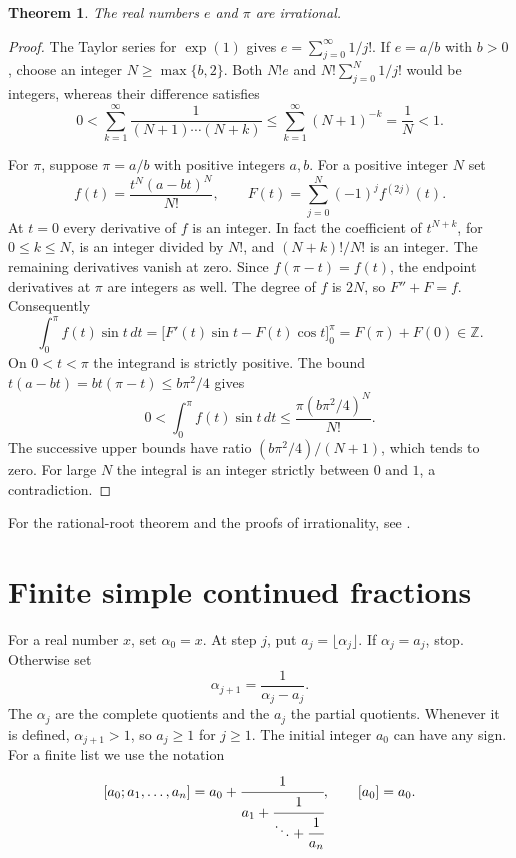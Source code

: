 \documentclass[11pt,oneside,openany]{book}
\theoremstyle{plain}
\newtheorem{theorem}{Theorem}[chapter]
\theoremstyle{definition}
\theoremstyle{remark}
\begin{document}
\begin{theorem}
The real numbers \(e\) and \(\pi\) are irrational.
\end{theorem}
\begin{proof}
The Taylor series for \(\exp(1)\) gives
\(e=\sum_{j=0}^{\infty}1/j!\). If \(e=a/b\) with \(b>0\), choose an
integer \(N\ge\max\{b,2\}\). Both \(N!e\) and
\(N!\sum_{j=0}^N1/j!\) would be integers, whereas their difference
satisfies
\[
 0<\sum_{k=1}^{\infty}\frac{1}{(N+1)\cdots(N+k)}
 \le \sum_{k=1}^{\infty}(N+1)^{-k}=\frac1N<1.
\]

For \(\pi\), suppose \(\pi=a/b\) with positive integers \(a,b\). For
a positive integer \(N\) set
\[
 f(t)=\frac{t^N(a-bt)^N}{N!},\qquad
 F(t)=\sum_{j=0}^{N}(-1)^j f^{(2j)}(t).
\]
At \(t=0\) every derivative of \(f\) is an integer. In fact the
coefficient of \(t^{N+k}\), for \(0\le k\le N\), is an integer divided
by \(N!\), and \((N+k)!/N!\) is an integer. The remaining derivatives
vanish at zero. Since \(f(\pi-t)=f(t)\), the endpoint derivatives at
\(\pi\) are integers as well. The degree of \(f\) is \(2N\), so
\(F''+F=f\). Consequently
\[
 \int_0^\pi f(t)\sin t\,dt
 =\bigl[F'(t)\sin t-F(t)\cos t\bigr]_0^\pi
 = F(\pi)+F(0)\in\mathbb Z.
\]
On \(0<t<\pi\) the integrand is strictly positive. The bound
\(t(a-bt)=bt(\pi-t)\le b\pi^2/4\) gives
\[
 0<\int_0^\pi f(t)\sin t\,dt
 \le \frac{\pi(b\pi^2/4)^N}{N!}.
\]
The successive upper bounds have ratio \((b\pi^2/4)/(N+1)\), which
tends to zero. For large \(N\) the integral is an integer strictly
between \(0\) and \(1\), a contradiction.
\end{proof}

For the rational-root theorem and the proofs of irrationality, see
\cite[\S6.3, Theorems 6.13 and 6.18 and Exercise 8]{nzm}.

\section{Finite simple continued fractions}
\label{nt:E02}

For a real number \(x\), set \(\alpha_0=x\). At step \(j\), put
\(a_j=\lfloor\alpha_j\rfloor\). If \(\alpha_j=a_j\), stop. Otherwise
set
\[
 \alpha_{j+1}=\frac{1}{\alpha_j-a_j}.
\]
The \(\alpha_j\) are the complete quotients and the \(a_j\) the partial
quotients. Whenever it is defined, \(\alpha_{j+1}>1\), so \(a_j\ge1\)
for \(j\ge1\). The initial integer \(a_0\) can have any sign. For a finite
list we use the notation
\[
 [a_0;a_1,\ldots,a_n]
 =a_0+\cfrac1{a_1+\cfrac1{\ddots+\cfrac1{a_n}}},
 \qquad [a_0]=a_0.
\]
\end{document}
